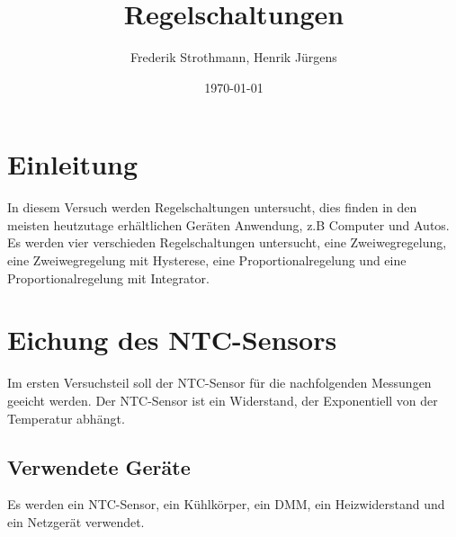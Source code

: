 \documentclass[12pt,a4paper]{article}
\title{Regelschaltungen}
\author{Frederik Strothmann, Henrik Jürgens}
\date{\today}
\begin{document}
\maketitle
\newpage
\tableofcontents
\newpage
\section{Einleitung}

In diesem Versuch werden Regelschaltungen untersucht, dies finden in den meisten heutzutage erhältlichen Geräten Anwendung, z.B Computer und Autos. Es werden vier verschieden Regelschaltungen untersucht, eine Zweiwegregelung, eine Zweiwegregelung mit Hysterese, eine Proportionalregelung und eine Proportionalregelung mit Integrator.


\section{Eichung des NTC-Sensors}
Im ersten Versuchsteil soll der NTC-Sensor für die nachfolgenden Messungen geeicht werden. Der NTC-Sensor ist ein Widerstand, der Exponentiell von der Temperatur abhängt.

\subsection{Verwendete Geräte}

Es werden ein NTC-Sensor, ein Kühlkörper, ein DMM, ein Heizwiderstand und ein Netzgerät verwendet.
\end{document}
